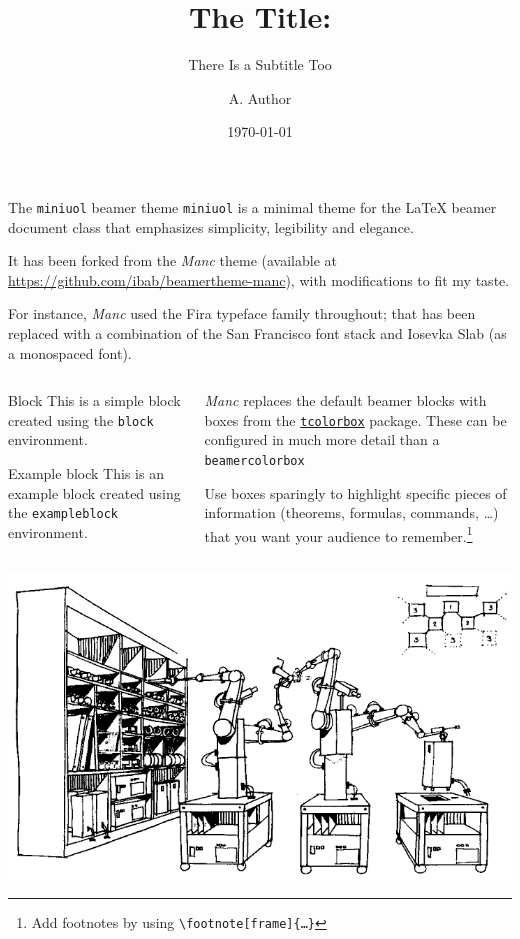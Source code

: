 \documentclass{beamer}
\title{The Title:}
\subtitle{There Is a Subtitle Too}
\date{\today}
\author{A. Author}
\institute{Institute}
\begin{document}
\begin{frame}
	\titlepage
\end{frame}

\begin{frame}{The \texttt{miniuol} beamer theme}
	\texttt{miniuol} is a minimal theme for the \LaTeX{} beamer document class that emphasizes simplicity, legibility and elegance.

	It has been forked from the \emph{Manc} theme (available at \url{https://github.com/ibab/beamertheme-manc}), with modifications to fit my taste.

	For instance, \emph{Manc} used the Fira typeface family throughout; that has been replaced with a combination of the San Francisco font stack and Iosevka Slab (as a monospaced font).
\end{frame}

\begin{frame}[fragile]
	\begin{columns}
		\begin{column}{0.5\textwidth}
			\begin{block}{Block}
				This is a simple block created using the \texttt{block} environment.
			\end{block}
			\begin{exampleblock}{Example block}
				This is an example block created using the \texttt{exampleblock} environment.
			\end{exampleblock}
		\end{column}
		\begin{column}{0.5\textwidth}
			\emph{Manc} replaces the default beamer blocks with boxes from the \href{https://www.ctan.org/pkg/tcolorbox}{\texttt{tcolorbox}} package.
			These can be configured in much more detail than a \texttt{beamercolorbox}
			\medskip

			Use boxes sparingly to highlight specific pieces of information (theorems, formulas, commands, …) that you want your audience to remember.\footnote[frame]{Add footnotes by using \texttt{\backslash footnote[frame]\{…\}}}
		\end{column}
	\end{columns}
\end{frame}

\begin{frame}
	\centering
	\includegraphics[width = \textwidth]{./graphics/self-replicating.png}
\end{frame}
\end{document}
